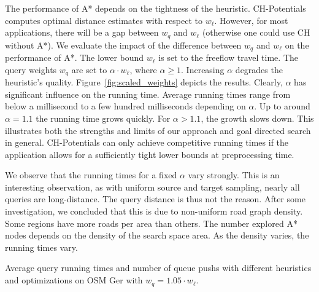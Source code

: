 \documentclass[manuscript,review]{acmart}
\begin{document}
The performance of A* depends on the tightness of the heuristic.
CH-Potentials computes optimal distance estimates with respect to $w_\ell$.
However, for most applications, there will be a gap between $w_q$ and $w_\ell$ (otherwise one could use CH without A*).
We evaluate the impact of the difference between $w_q$ and $w_\ell$ on the performance of A*.
The lower bound $w_\ell$ is set to the freeflow travel time.
The query weights $w_q$ are set to $\alpha \cdot w_\ell$, where $\alpha\ge 1$.
Increasing $\alpha$ degrades the heuristic's quality.
Figure~\ref{fig:scaled_weights} depicts the results.
Clearly, $\alpha$ has significant influence on the running time.
Average running times range from below a millisecond to a few hundred milliseconds depending on $\alpha$.
Up to around $\alpha = 1.1$ the running time grows quickly.
For $\alpha > 1.1$, the growth slows down.
This illustrates both the strengths and limits of our approach and goal directed search in general.
CH-Potentials can only achieve competitive running times if the application allows for a sufficiently tight lower bounds at preprocessing time.

We observe that the running times for a fixed $\alpha$ vary strongly.
This is an interesting observation, as with uniform source and target sampling, nearly all queries are long-distance.
The query distance is thus not the reason.
After some investigation, we concluded that this is due to non-uniform road graph density.
Some regions have more roads per area than others.
The number explored A* nodes depends on the density of the search space area.
As the density varies, the running times vary.

\begin{table}
\centering
\caption{Average query running times and number of queue pushs with different heuristics and optimizations on OSM Ger with $w_q = 1.05 \cdot w_\ell$.}\label{tab:building_blocks}

\end{table}
\end{document}
